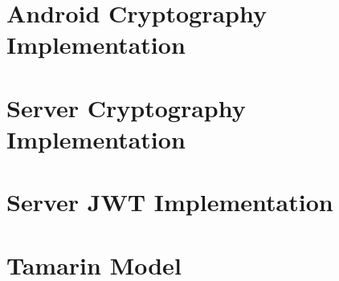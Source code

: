 \chapter{Android Cryptography Implementation}


\chapter{Server Cryptography Implementation}


\chapter{Server JWT Implementation}


\chapter{Tamarin Model}\label{ch:tamarin}


